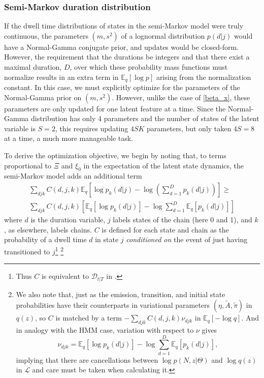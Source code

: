 \documentclass{article} %
\begin{document}
\subsubsection{Semi-Markov duration distribution}
If the dwell time distributions of states in the semi-Markov model were truly continuous, the parameters $(m, s^2)$ of a lognormal distribution $p(d|j)$ would have a Normal-Gamma conjugate prior, and updates would be closed-form. However, the requirement that the durations be integers and that there exist a maximal duration, $D$, over which these probability mass functions must normalize results in an extra term in $\mathbb{E}_q[\log p]$ arising from the normalization constant. In this case, we must explicitly optimize for the parameters of the Normal-Gamma prior on $(m, s^2)$. However, unlike the case of \ref{beta_x}, these parameters are only updated for one latent feature at a time. Since the Normal-Gamma distribution has only 4 parameters and the number of states of the latent variable is $S = 2$, this requires updating $4SK$ parameters, but only taken $4S = 8$ at a time, a much more manageable task.

To derive the optimization objective, we begin by noting that, to terms proportional to $\Xi$ and $\xi_0$ in the expectation of the latent state dynamics, the semi-Markov model adds an additional term
\begin{multline}
    \sum_{d j k} C(d, j, k) \mathbb{E}_q \left[\log p_k(d|j) - \log \left(\sum_{d=1}^D p_k(d|j) \right) \right] \ge \\
    \sum_{d j k} C(d, j, k) \left[\mathbb{E}_q \left[\log p_k(d|j)\right] - \log \sum_{d=1}^D \mathbb{E}_q\left[p_k(d|j) \right] \right]
\end{multline}
where $d$ is the duration variable, $j$ labels states of the chain (here 0 and 1), and $k$, as elsewhere, labels chains\cite{Mitchell1993-sl,Mitchell1995-go,Yu2006-bb}. $C$ is defined for each state and chain as the probability of a dwell time $d$ in state $j$ \emph{conditioned on} the event of just having transitioned to $j$\footnote{Thus $C$ is equivalent to $\mathcal{D}_{t|T}$ in \cite{Yu2006-bb}.}
\footnote{
We also note that, just as the emission, transition, and initial state probabilities have their counterparts in variational parameters $(\eta, \tilde{A}, \tilde{\pi})$ in $q(z)$, so $C$ is matched by a term $-\sum_{djk} C(d, j, k) \nu_{djk}$ in $\mathbb{E}_q[-\log q]$. And in analogy with the HMM case, variation with respect to $\nu$ gives
\begin{equation}
    \nu_{djk} = \mathbb{E}_q \left[\log p_k(d|j)\right] - \log \sum_{d=1}^D \mathbb{E}_q\left[p_k(d|j) \right],
\end{equation}
implying that there are cancellations between $\log p(N, z|\Theta)$ and $\log q(z)$ in $\mathcal{L}$ and care must be taken when calculating it\cite{beal2003variational}.}
\end{document}
